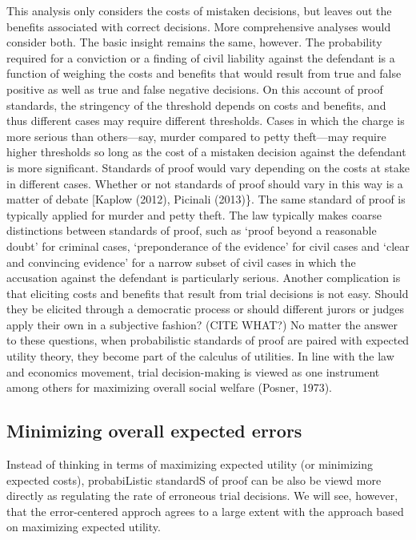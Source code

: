 \documentclass[10pt,dvipsnames]{scrartcl}
\begin{document}
This analysis only considers the costs of mistaken decisions, but leaves
out the benefits associated with correct decisions. More comprehensive
analyses would consider both. The basic insight remains the same,
however. The probability required for a conviction or a finding of civil
liability against the defendant is a function of weighing the costs and
benefits that would result from true and false positive as well as true
and false negative decisions. On this account of proof standards, the
stringency of the threshold depends on costs and benefits, and thus
different cases may require different thresholds. Cases in which the
charge is more serious than others---say, murder compared to petty
theft---may require higher thresholds so long as the cost of a mistaken
decision against the defendant is more significant. Standards of proof
would vary depending on the costs at stake in different cases. Whether
or not standards of proof should vary in this way is a matter of debate
{[}Kaplow (2012), Picinali (2013)\}. The same standard of proof is
typically applied for murder and petty theft. The law typically makes
coarse distinctions between standards of proof, such as `proof beyond a
reasonable doubt' for criminal cases, `preponderance of the evidence'
for civil cases and `clear and convincing evidence' for a narrow subset
of civil cases in which the accusation against the defendant is
particularly serious. Another complication is that eliciting costs and
benefits that result from trial decisions is not easy. Should they be
elicited through a democratic process or should different jurors or
judges apply their own in a subjective fashion? (CITE WHAT?) No matter
the answer to these questions, when probabilistic standards of proof are
paired with expected utility theory, they become part of the calculus of
utilities. In line with the law and economics movement, trial
decision-making is viewed as one instrument among others for maximizing
overall social welfare (Posner, 1973).

\hypertarget{minimizing-overall-expected-errors}{%
\subsection{Minimizing overall expected
errors}\label{minimizing-overall-expected-errors}}

Instead of thinking in terms of maximizing expected utility (or
minimizing expected costs), probabiListic standardS of proof can be also
be viewd more directly as regulating the rate of erroneous trial
decisions. We will see, however, that the error-centered approch agrees
to a large extent with the approach based on maximizing expected
utility.
\end{document}
